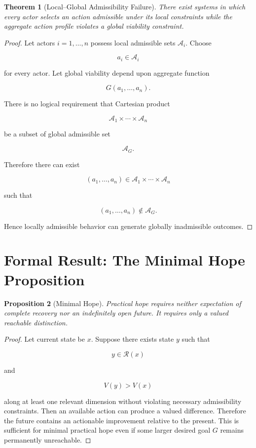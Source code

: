 \documentclass[11pt,oneside]{book}
\newtheorem{theorem}{Theorem}[chapter]
\newtheorem{proposition}[theorem]{Proposition}
\theoremstyle{definition}
\theoremstyle{remark}
\newcommand{\A}{\mathcal{A}}
\newcommand{\R}{\mathcal{R}}
\begin{document}
\begin{theorem}[Local--Global Admissibility Failure]
There exist systems in which every actor selects an action admissible under its local constraints while the aggregate action profile violates a global viability constraint.
\end{theorem}

\begin{proof}
Let actors \(i=1,\ldots,n\) possess local admissible sets \(\A_i\). Choose

\[
a_i\in\A_i
\]

for every actor. Let global viability depend upon aggregate function

\[
G(a_1,\ldots,a_n).
\]

There is no logical requirement that Cartesian product

\[
\A_1\times\cdots\times\A_n
\]

be a subset of global admissible set

\[
\A_G.
\]

Therefore there can exist

\[
(a_1,\ldots,a_n)
\in
\A_1\times\cdots\times\A_n
\]

such that

\[
(a_1,\ldots,a_n)\notin\A_G.
\]

Hence locally admissible behavior can generate globally inadmissible outcomes.
\end{proof}

\section{Formal Result: The Minimal Hope Proposition}

\begin{proposition}[Minimal Hope]
Practical hope requires neither expectation of complete recovery nor an indefinitely open future. It requires only a valued reachable distinction.
\end{proposition}

\begin{proof}
Let current state be \(x\). Suppose there exists state \(y\) such that

\[
y\in\R(x)
\]

and

\[
V(y)>V(x)
\]

along at least one relevant dimension without violating necessary admissibility constraints. Then an available action can produce a valued difference. Therefore the future contains an actionable improvement relative to the present. This is sufficient for minimal practical hope even if some larger desired goal \(G\) remains permanently unreachable.
\end{proof}
\end{document}
